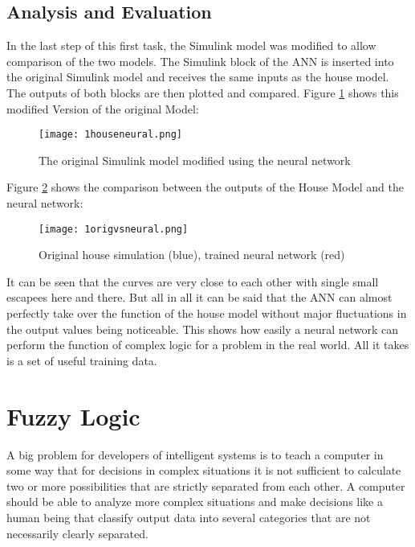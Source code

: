 \section{Analysis and Evaluation}
In the last step of this first task, the Simulink model was modified to allow comparison of the two models. The Simulink block of the ANN is inserted into the original Simulink model and receives the same inputs as the house model. The outputs of both blocks are then plotted and compared. Figure \ref{houseneural} shows this modified Version of the original Model:
\begin{figure}[H]
	\centering
	\texttt{[image: 1houseneural.png]}
	\caption[Caption for LOF]{The original Simulink model modified using the neural network}
	\label{houseneural}
\end{figure}
Figure \ref{origvsneural} shows the comparison between the outputs of the House Model and the neural network:
\begin{figure}[H]
	\centering
	\texttt{[image: 1origvsneural.png]}
	\caption[Caption for LOF]{Original house simulation (blue), trained neural network (red)}
	\label{origvsneural}
\end{figure}
It can be seen that the curves are very close to each other with single small escapees here and there. But all in all it can be said that the ANN can almost perfectly take over the function of the house model without major fluctuations in the output values being noticeable. This shows how easily a neural network can perform the function of complex logic for a problem in the real world. All it takes is a set of useful training data.
\chapter{Fuzzy Logic}
\label{fuzzy}
A big problem for developers of intelligent systems is to teach a computer in some way that for decisions in complex situations it is not sufficient to calculate two or more possibilities that are strictly separated from each other. A computer should be able to analyze more complex situations and make decisions like a human being that classify output data into several categories that are not necessarily clearly separated. \cite[][]{LB01}
